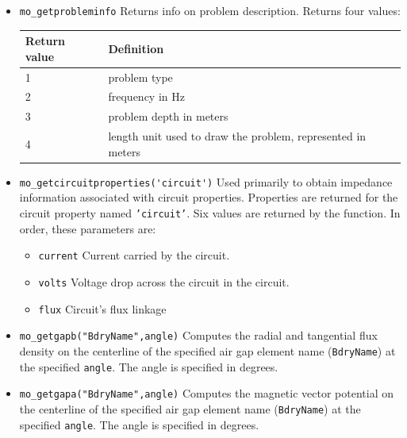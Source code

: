 \begin{itemize}
To write data instead of a plot to disk, the command would
be of the form:

\begin{tabular}{l} \verb+mo_makeplot(2,200,'c:\temp\myfile.txt',0)+ \end{tabular}

\item \verb+mo_getprobleminfo+
Returns info on problem description.  Returns four values:
\begin{center}
\begin{tabular}{ll} \hline
Return value & Definition \\ \hline 
1 &  problem type  \\ 
2 & frequency in Hz  \\
3 & problem depth in meters \\ 
4 & length unit used to draw the problem, represented in meters\\ \hline
\end{tabular}
\end{center}

\item{\verb+mo_getcircuitproperties('circuit')+}
Used primarily to obtain impedance information associated with
circuit properties.  Properties are returned for the circuit
property named {\tt 'circuit'}. Six values are returned by the
function.  In order, these parameters are:
\begin{itemize}
        \item{\verb+current+} Current carried by the circuit.
        \item{\verb+volts+}  Voltage drop across the circuit in the circuit.
        \item{\verb+flux+} Circuit's flux linkage
\end{itemize}




\item{\verb+mo_getgapb("BdryName",angle)+}
Computes the radial and tangential flux density on the centerline of the
specified air gap element name (\verb+BdryName+) at the specified \verb+angle+.  The angle is specified in degrees.

\item{\verb+mo_getgapa("BdryName",angle)+}
Computes the magnetic vector potential on the centerline of the
specified air gap element name (\verb+BdryName+) at the specified \verb+angle+.  The angle is specified in degrees.


\end{itemize}
